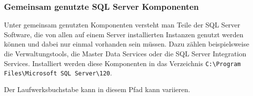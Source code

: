         \subsubsection{Gemeinsam genutzte SQL Server Komponenten}
        Unter gemeinsam genutzten Komponenten versteht man Teile der SQL Server
        Software, die von allen auf einem Server installierten Instanzen genutzt
        werden können und dabei nur einmal vorhanden sein müssen.
        Dazu zählen beispielsweise die Verwaltungstools, die Master Data
        Services oder die SQL Server Integration Services. Installiert werden
        diese Komponenten in das Verzeichnis \texttt{C:\textbackslash Program Files\textbackslash Microsoft SQL
        Server\textbackslash 120}.
  
        Der Laufwerksbuchstabe kann in diesem Pfad kann variieren.
        \begin{literaturinternet}
          \item \cite{ms143547}
        \end{literaturinternet}
